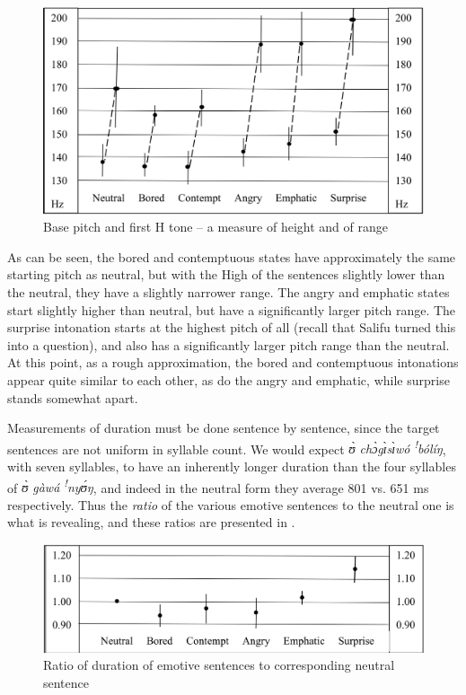 \documentclass[output=paper]{langsci/langscibook}
\begin{document}
\begin{figure}[h]
\includegraphics[width=\textwidth]{figures/cahillfig2}
\caption{Base pitch and first H tone -- a measure of height and of range}
\label{fig:2.cahill}
\end{figure}
 
As can be seen, the bored and contemptuous states have approximately the same starting pitch as neutral, but with the High of the sentences slightly lower than the neutral, they have a slightly narrower range.  The angry and emphatic states start slightly higher than neutral, but have a significantly larger pitch range.  The surprise intonation starts at the highest pitch of all (recall that Salifu turned this into a question), and also has a significantly larger pitch range than the neutral. At this point, as a rough approximation, the bored and contemptuous intonations appear quite similar to each other, as do the angry and emphatic, while surprise stands somewhat apart. 

Measurements of duration must be done sentence by sentence, since the target sentences are not uniform in syllable count. We would expect \textit{ʊ̀ chɔ̀gɪ̀sɪ̀wó \textsuperscript{!}bólíŋ}, with seven syllables, to have an inherently longer duration than the four syllables of \textit{ʊ̀ gàwá  \textsuperscript{!}nyʊ́ŋ}, and indeed in the neutral form they average 801 vs. 651 ms respectively. Thus the \emph{ratio} of the various emotive sentences to the neutral one is what is revealing, and these ratios are presented in . 

\begin{figure}[h]
\includegraphics[width=\textwidth]{figures/cahillfig3}
\caption{Ratio of duration of emotive sentences to corresponding neutral sentence}
\label{fig:3.cahill}
\end{figure}
\end{document}

